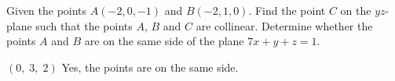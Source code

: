 
\begin{Exercise}[
name={},
title={}, 
difficulty=0,
origin={\cite{BS}}]
Given the points $A(-2, 0, -1)$ and $B(-2, 1, 0)$.
\Question Find the point $C$ on the $yz$-plane such that the points $A$, $B$ and $C$ are collinear.
\Question Determine whether the points $A$ and $B$ are on the same side of the plane $7x+y+z=1$.

\end{Exercise}
\begin{Answer}
\Question $(0,\;3,\;2)$
\Question Yes, the points are on the same side.
\end{Answer}
